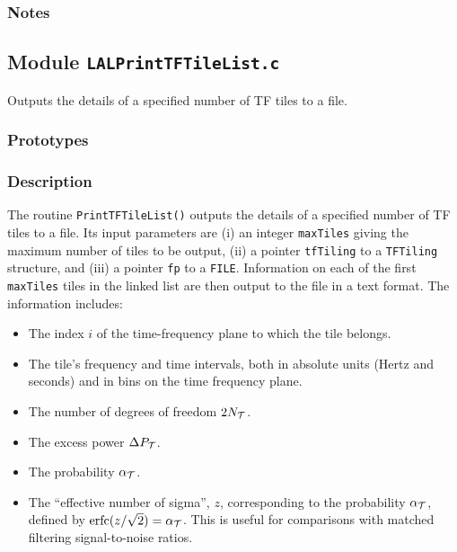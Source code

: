 \subsubsection*{Notes}

\vfill{\footnotesize}

\newpage
\subsection{Module \texttt{LALPrintTFTileList.c}}
\label{ss:LALPrintTFTileList.c}

Outputs the details of a specified number of TF tiles to a file.

\subsubsection*{Prototypes}
\vspace{0.1in}


\subsubsection*{Description}

The routine \verb+PrintTFTileList()+ outputs the details of a specified number
of TF tiles to a file.  Its input parameters are (i) an integer
\verb+maxTiles+ giving the maximum number of tiles to be output, (ii) a
pointer \verb+tfTiling+ to a \verb+TFTiling+ structure, and (iii) a pointer
\verb+fp+ to a \verb+FILE+.  Information on each of the first \verb+maxTiles+
tiles in the linked list are then output to the file in a text format.  The
information includes:
\begin{itemize}

\item The index $i$ of the time-frequency plane
to which the tile belongs.

\item The tile's frequency and time intervals, both in absolute units
(Hertz and seconds) and in bins on the time frequency plane.

\item The number of degrees of freedom $2 N_{\cal T}$.

\item The excess power $\Delta P_{\cal T}$.

\item The probability $\alpha_{\cal T}$.  

\item The ``effective number of sigma'', $z$, corresponding to the
probability $\alpha_{\cal T}$, defined by ${\rm erfc}(z/\sqrt{2}) =
\alpha_{\cal T}$.  This is useful for comparisons with matched
filtering signal-to-noise ratios.

\end{itemize}

